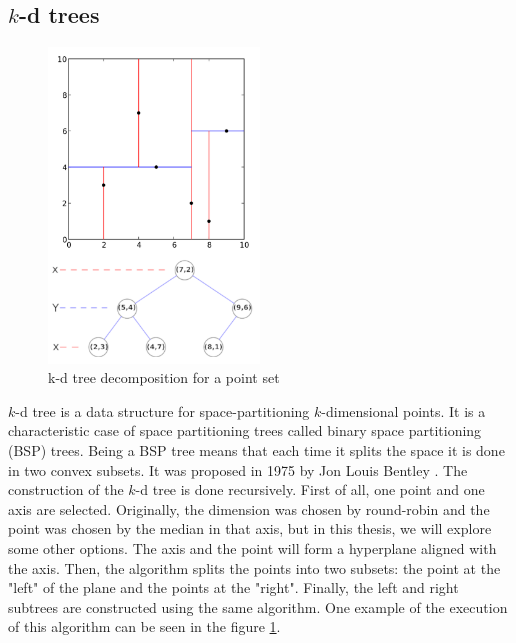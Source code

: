 \subsection{$k$-d trees}
\begin{figure}
    \centering
    \includegraphics[width=0.5\textwidth]{figures/kdtree.png}
    \caption{k-d tree decomposition for a point set \cite{wiki:kdtree}}
    \label{fig:kdtree}
\end{figure}
$k$-d tree is a data structure for space-partitioning $k$-dimensional points. It is a characteristic case of space partitioning trees called binary space partitioning (BSP) trees. Being a BSP tree means that each time it splits the space it is done in two convex subsets. It was proposed in 1975 by Jon Louis Bentley \cite{Bentley}. The construction of the $k$-d tree is done recursively. First of all, one point and one axis are selected. Originally, the dimension was chosen by round-robin and the point was chosen by the median in that axis, but in this thesis, we will explore some other options. The axis and the point will form a hyperplane aligned with the axis. Then, the algorithm splits the points into two subsets: the point at the "left" of the plane and the points at the "right". Finally, the left and right subtrees are constructed using the same algorithm. One example of the execution of this algorithm can be seen in the figure \ref{fig:kdtree}.

